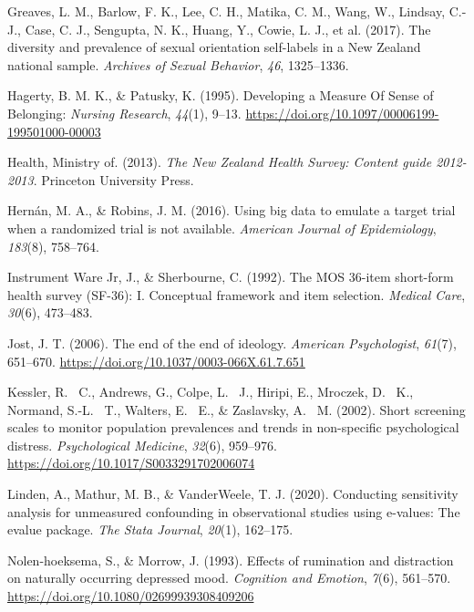 \documentclass[
  single column]{article}
\newlength{\cslhangindent}
\newenvironment{CSLReferences}[2] %
 {\begin{list}{}{%
  \setlength{\itemindent}{0pt}
  \setlength{\leftmargin}{0pt}
  \setlength{\parsep}{0pt}
  \ifodd #1
   \setlength{\leftmargin}{\cslhangindent}
   \setlength{\itemindent}{-1\cslhangindent}
  \fi
  \setlength{\itemsep}{#2\baselineskip}}}
 {\end{list}}
\begin{document}
\begin{CSLReferences}{1}{0}
Greaves, L. M., Barlow, F. K., Lee, C. H., Matika, C. M., Wang, W.,
Lindsay, C.-J., Case, C. J., Sengupta, N. K., Huang, Y., Cowie, L. J.,
et al. (2017). The diversity and prevalence of sexual orientation
self-labels in a {N}ew {Z}ealand national sample. \emph{Archives of
Sexual Behavior}, \emph{46}, 1325--1336.

Hagerty, B. M. K., \& Patusky, K. (1995). Developing a Measure Of Sense
of Belonging: \emph{Nursing Research}, \emph{44}(1), 9--13.
\url{https://doi.org/10.1097/00006199-199501000-00003}

Health, Ministry of. (2013). \emph{The {N}ew {Z}ealand {H}ealth
{S}urvey: Content guide 2012-2013}. Princeton University Press.

Hernán, M. A., \& Robins, J. M. (2016). Using big data to emulate a
target trial when a randomized trial is not available. \emph{American
Journal of Epidemiology}, \emph{183}(8), 758--764.

Instrument Ware Jr, J., \& Sherbourne, C. (1992). The MOS 36-item
short-form health survey (SF-36): I. Conceptual framework and item
selection. \emph{Medical Care}, \emph{30}(6), 473--483.

Jost, J. T. (2006). The end of the end of ideology. \emph{American
Psychologist}, \emph{61}(7), 651--670.
\url{https://doi.org/10.1037/0003-066X.61.7.651}

Kessler, R. ~C., Andrews, G., Colpe, L. ~J., Hiripi, E., Mroczek, D.
~K., Normand, S.-L. ~T., Walters, E. ~E., \& Zaslavsky, A. ~M. (2002).
Short screening scales to monitor population prevalences and trends in
non-specific psychological distress. \emph{Psychological Medicine},
\emph{32}(6), 959--976. \url{https://doi.org/10.1017/S0033291702006074}

Linden, A., Mathur, M. B., \& VanderWeele, T. J. (2020). Conducting
sensitivity analysis for unmeasured confounding in observational studies
using e-values: The evalue package. \emph{The Stata Journal},
\emph{20}(1), 162--175.

Nolen-hoeksema, S., \& Morrow, J. (1993). Effects of rumination and
distraction on naturally occurring depressed mood. \emph{Cognition and
Emotion}, \emph{7}(6), 561--570.
\url{https://doi.org/10.1080/02699939308409206}


\end{CSLReferences}
\end{document}
